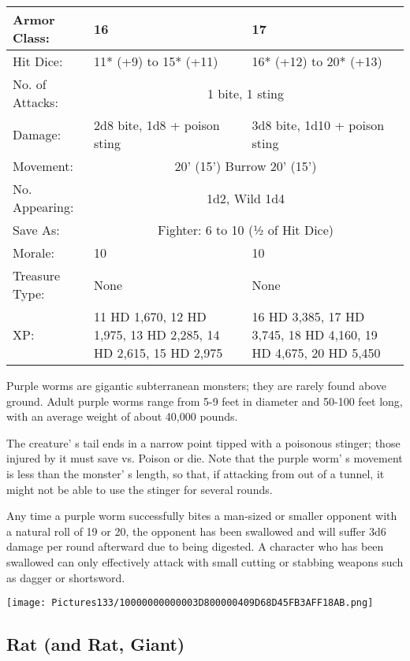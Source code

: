 \documentclass[a4paper,twoside,openany,10pt]{book}
\begin{document}
\begin{multicols}{2}
\begin{tabularx}{0.50\textwidth}{@{}lXX@{}}
Armor Class: & 16 & 17 \\\hline
Hit Dice: & 11* (+9) to 15* (+11) & 16* (+12) to 20* (+13) \\\hline
No. of Attacks: & \multicolumn{2}{c}{1 bite, 1 sting} \\\hline
Damage: & 2d8 bite, 1d8 + poison sting & 3d8 bite, 1d10 + poison sting \\\hline
Movement: & \multicolumn{2}{c}{20' (15') Burrow 20' (15')}\\\hline
No. Appearing: &  \multicolumn{2}{c}{1d2, Wild 1d4}\\\hline
Save As: & \multicolumn{2}{c}{Fighter: 6 to 10 (½ of Hit Dice)} \\\hline
Morale: & 10 & 10 \\\hline
Treasure Type: & None & None \\\hline
XP: & 11 HD 1,670, 12 HD 1,975, 13 HD 2,285, 14 HD 2,615, 15 HD 2,975 & 16 HD 3,385, 17 HD 3,745, 18 HD 4,160, 19 HD 4,675, 20 HD 5,450  \\\hline
\end{tabularx}\medskip

Purple worms are gigantic subterranean monsters; they are rarely found above ground. Adult purple worms range from 5-9 feet in diameter and 50-100 feet long, with an average weight of about 40,000 pounds. 

The creature' s tail ends in a narrow point tipped with a poisonous stinger; those injured by it must save vs. Poison or die. Note that the purple worm' s movement is less than the monster' s length, so that, if attacking from out of a tunnel, it might not be able to use the stinger for several rounds.

Any time a purple worm successfully bites a man-sized or smaller opponent with a natural roll of 19 or 20, the opponent has been swallowed and will suffer 3d6 damage per round afterward due to being digested. A character who has been swallowed can only effectively attack with small cutting or stabbing weapons such as dagger or shortsword.

\begin{center} \texttt{[image: Pictures133/10000000000003D800000409D68D45FB3AFF18AB.png]} \end{center}


\subsection*{Rat (and Rat, Giant)}\label{rat-and-rat-giant}


\end{multicols}
\end{document}
